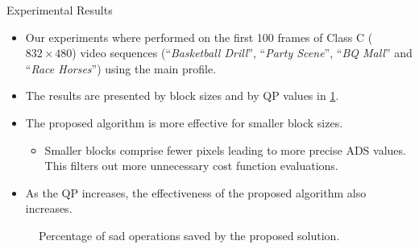 \documentclass[10pt]{beamer}
\begin{document}
\begin{frame}[t]
\begin{columns}[t, onlytextwidth]
    \begin{column}{0.32\textwidth}
        \begin{block}{Experimental Results}
            \begin{itemize}
            \item Our experiments where performed on the first 100 frames of Class C ($832\!\times\!480$) video sequences (``\textit{Basketball Drill}'', ``\textit{Party Scene}'', ``\textit{BQ Mall}'' and ``\textit{Race Horses}'') using the main profile.
            \item The results are presented by block sizes and by QP values in \cref{fig:SADSavings}.
            \item The proposed algorithm is more effective for smaller block sizes. 
                \begin{itemize}
                    \item Smaller blocks comprise fewer pixels leading to more precise ADS values. This filters out more unnecessary cost function evaluations.
                \end{itemize}
            \item As the QP increases, the effectiveness of the proposed algorithm also increases.
            \end{itemize}
            
            \begin{figure}[htb]
                \vspace{-2em}
                \centering
                
                \vspace{-2em}
                \caption{Percentage of \gls{sad} operations saved by the proposed solution.}
                \label{fig:SADSavings}
            \end{figure}
        \end{block}


\end{column}
\end{columns}
\end{frame}
\end{document}
